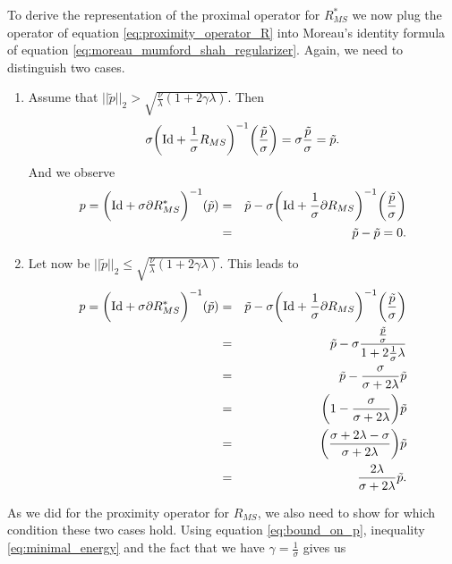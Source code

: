         To derive the representation of the proximal operator for $R_{MS}^{\ast}$ we now plug the operator of equation \ref{eq:proximity_operator_R} into Moreau's identity formula of equation \ref{eq:moreau_mumford_shah_regularizer}. Again, we need to distinguish two cases.
        \begin{enumerate}
            \item Assume that $||\tilde{p}||_{2} > \sqrt{\frac{\nu}{\lambda}(1 + 2\gamma\lambda)}$. Then
                $$
                    \sigma\bigg( \textnormal{Id} + \frac{1}{\sigma} R_{MS} \bigg)^{-1} \bigg(\frac{\tilde{p}}{\sigma} \bigg) = \sigma \frac{\tilde{p}}{\sigma} = \tilde{p}.
                $$
            And we observe
                \begin{eqnarray}
                    p = \bigg( \textnormal{Id} + \sigma \partial R_{MS}^{\ast} \bigg)^{-1}(\tilde{p}) &=& \tilde{p} - \sigma \bigg( \textnormal{Id} + \frac{1}{\sigma} \partial R_{MS} \bigg)^{-1} \bigg(\frac{\tilde{p}}{\sigma} \bigg) \notag \\
                    &=& \tilde{p} - \tilde{p} = 0. \notag
                \end{eqnarray}
            \item Let now be $||\tilde{p}||_{2} \le \sqrt{\frac{\nu}{\lambda}(1 + 2\gamma\lambda)}$. This leads to
                \begin{eqnarray}
                    p = \bigg( \textnormal{Id} + \sigma \partial R_{MS}^{\ast} \bigg)^{-1}(\tilde{p}) &=& \tilde{p} - \sigma \bigg( \textnormal{Id} + \frac{1}{\sigma} \partial R_{MS} \bigg)^{-1} \bigg(\frac{\tilde{p}}{\sigma} \bigg) \notag \\
                    &=& \tilde{p} - \sigma \frac{\frac{\tilde{p}}{\sigma}}{1 + 2\frac{1}{\sigma}\lambda} \notag \\
                    &=& \tilde{p} - \frac{\sigma}{\sigma + 2\lambda}\tilde{p} \notag \\
                    &=& \bigg(1 - \frac{\sigma}{\sigma + 2\lambda}\bigg) \tilde{p} \notag \\
                    &=& \bigg(\frac{\sigma + 2\lambda - \sigma}{\sigma + 2\lambda}\bigg) \tilde{p} \notag \\
                    &=& \frac{2\lambda}{\sigma + 2\lambda} \tilde{p}. \label{eq:proximity_operator_R_star}
                \end{eqnarray}
        \end{enumerate}
        As we did for the proximity operator for $R_{MS}$, we also need to show for which condition these two cases hold. Using equation \ref{eq:bound_on_p}, inequality \ref{eq:minimal_energy} and the fact that we have $\gamma = \frac{1}{\sigma}$ gives us
